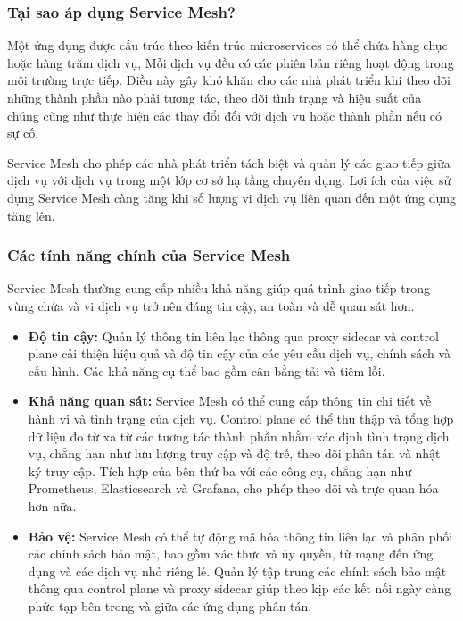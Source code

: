 \documentclass[14pt,a4paper]{book}
\begin{document}
		\subsubsection{Tại sao áp dụng Service Mesh?}
		\hspace{0.6cm}Một ứng dụng được cấu trúc theo kiến trúc microservices có thể chứa hàng chục hoặc hàng trăm dịch vụ, Mỗi dịch vụ đều có các phiên bản riêng hoạt động trong môi trường trực tiếp. Điều này gây khó khăn cho các nhà phát triển khi theo dõi những thành phần nào phải tương tác, theo dõi tình trạng và hiệu suất của chúng cũng như thực hiện các thay đổi đối với dịch vụ hoặc thành phần nếu có sự cố.
		
		Service Mesh cho phép các nhà phát triển tách biệt và quản lý các giao tiếp giữa dịch vụ với dịch vụ trong một lớp cơ sở hạ tầng chuyên dụng. Lợi ích của việc sử dụng Service Mesh càng tăng khi số lượng vi dịch vụ liên quan đến một ứng dụng tăng lên.
		
			\subsubsection{Các tính năng chính của Service Mesh}
		\hspace{0.6cm}Service Mesh thường cung cấp nhiều khả năng giúp quá trình giao tiếp trong vùng chứa và vi dịch vụ trở nên đáng tin cậy, an toàn và dễ quan sát hơn.
		\begin{itemize}
			\item \textbf{Độ tin cậy:} Quản lý thông tin liên lạc thông qua proxy sidecar và control plane cải thiện hiệu quả và độ tin cậy của các yêu cầu dịch vụ, chính sách và cấu hình. Các khả năng cụ thể bao gồm cân bằng tải và tiêm lỗi.
			\item \textbf{Khả năng quan sát:} Service Mesh có thể cung cấp thông tin chi tiết về hành vi và tình trạng của dịch vụ. Control plane có thể thu thập và tổng hợp dữ liệu đo từ xa từ các tương tác thành phần nhằm xác định tình trạng dịch vụ, chẳng hạn như lưu lượng truy cập và độ trễ, theo dõi phân tán và nhật ký truy cập. Tích hợp của bên thứ ba với các công cụ, chẳng hạn như Prometheus, Elasticsearch và Grafana, cho phép theo dõi và trực quan hóa hơn nữa.
			\item \textbf{Bảo vệ:} Service Mesh có thể tự động mã hóa thông tin liên lạc và phân phối các chính sách bảo mật, bao gồm xác thực và ủy quyền, từ mạng đến ứng dụng và các dịch vụ nhỏ riêng lẻ. Quản lý tập trung các chính sách bảo mật thông qua control plane và proxy sidecar giúp theo kịp các kết nối ngày càng phức tạp bên trong và giữa các ứng dụng phân tán.
		\end{itemize}
		
\end{document}
